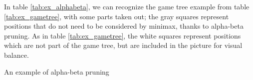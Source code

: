In table \ref{tab:ex_alphabeta}, we can recognize the game tree example from table \ref{tab:ex_gametree}, with some parts taken out; the gray squares represent positions that do not need to be considered by minimax, thanks to alpha-beta pruning.
As in table \ref{tab:ex_gametree}, the white squares represent positions which are not part of the game tree, but are included in the picture for visual balance.

\begin{center}
\def\arraystretch{5.5}
\begin{table}
\def\svgwidth{\columnwidth} 
\caption{An example of alpha-beta pruning}
\label{tab:ex_alphabeta}
\end{table}
\end{center}
